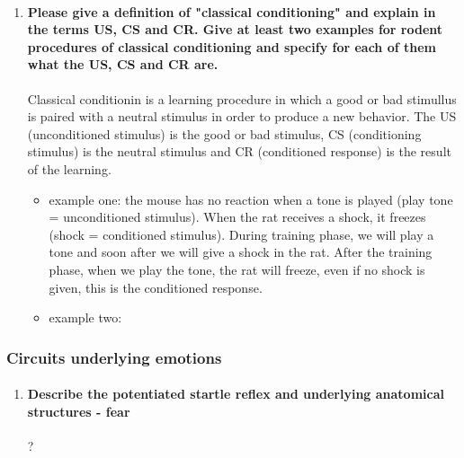 \documentclass[12pt,article,oneside,a4paper]{memoir}
\begin{document}
\begin{enumerate}
\item \paragraph{Please give a definition of "classical conditioning" and explain in the terms US, CS and CR. Give at least two examples for rodent procedures of classical conditioning and specify for each of them what the US, CS and CR are.}
Classical conditionin is a learning procedure in which a good or bad stimullus is paired with a neutral stimulus in order to produce a new behavior. The US (unconditioned stimulus) is the good or bad stimulus, CS (conditioning stimulus) is the neutral stimulus and CR (conditioned response) is the result of the learning.
\begin{itemize}
\item example one: the mouse has no reaction when a tone is played (play tone = unconditioned stimulus). When the rat receives a shock, it freezes (shock = conditioned stimulus). During training phase, we will play a tone and soon after we will give a shock in the rat. After the training phase, when we play the tone, the rat will freeze, even if no shock is given, this is the conditioned response.
\item example two: 
\end{itemize} 

\end{enumerate}

\subsubsection{Circuits underlying emotions}

\begin{enumerate}
\item \paragraph{Describe the potentiated startle reflex and underlying anatomical structures - fear} ?
\end{enumerate}

\end{document}

